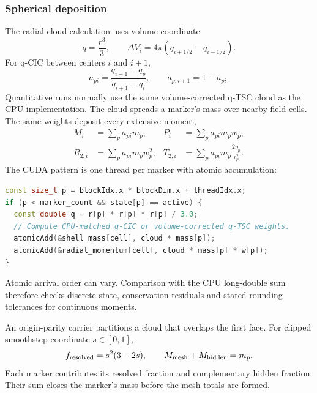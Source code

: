 \subsubsection{Spherical deposition}

The radial cloud calculation uses volume coordinate
\begin{equation}
 q=\frac{r^3}{3},\qquad
 \Delta V_i=4\pi(q_{i+1/2}-q_{i-1/2}).
\end{equation}
For q-CIC between centers \(i\) and \(i+1\),
\begin{equation}
 a_{pi}=\frac{q_{i+1}-q_p}{q_{i+1}-q_i},\qquad
 a_{p,i+1}=1-a_{pi}.
\end{equation}
Quantitative runs normally use the same volume-corrected q-TSC cloud as the
CPU implementation. The cloud spreads a marker's mass over nearby field
cells. The same weights deposit every extensive moment,
\begin{align}
 M_i &= \sum_p a_{pi}m_p,&
 P_i &= \sum_p a_{pi}m_pw_p,\\
 R_{2,i} &= \sum_p a_{pi}m_pw_p^2,&
 T_{2,i} &= \sum_p a_{pi}m_p\frac{2\eta_p}{r_p^2}.
\end{align}
The CUDA pattern is one thread per marker with atomic accumulation:
\par\noindent\begin{minipage}{\linewidth}
\begin{lstlisting}[language=C++]
const size_t p = blockIdx.x * blockDim.x + threadIdx.x;
if (p < marker_count && state[p] == active) {
  const double q = r[p] * r[p] * r[p] / 3.0;
  // Compute CPU-matched q-CIC or volume-corrected q-TSC weights.
  atomicAdd(&shell_mass[cell], cloud * mass[p]);
  atomicAdd(&radial_momentum[cell], cloud * mass[p] * w[p]);
}
\end{lstlisting}
\end{minipage}
Atomic arrival order can vary. Comparison with the CPU long-double sum
therefore checks discrete state, conservation residuals and stated rounding
tolerances for continuous moments.

An origin-parity carrier partitions a cloud that overlaps the first face.
For clipped smoothstep coordinate \(s\in[0,1]\),
\begin{equation}
 f_{\rm resolved}=s^2(3-2s),\qquad
 M_{\rm mesh}+M_{\rm hidden}=m_p.
\end{equation}
Each marker contributes its resolved fraction and complementary hidden
fraction. Their sum closes the marker's mass before the mesh totals are formed.

